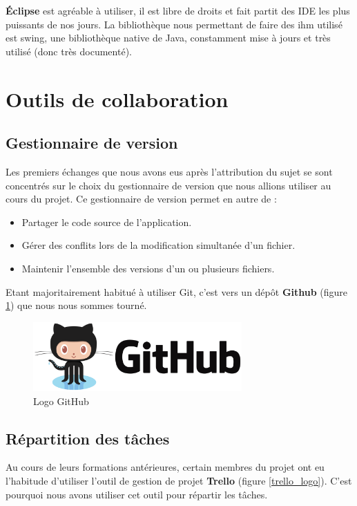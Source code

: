 \textbf{Éclipse} est agréable à utiliser, il est libre de droits et fait partit des IDE les plus puissants de nos jours.
La bibliothèque nous permettant de faire des \gls{ihm} utilisé est swing, une bibliothèque native de Java, constamment mise à jours et très utilisé (donc très documenté).



\section{Outils de collaboration}

\subsection{Gestionnaire de version}
Les premiers échanges que nous avons eus après l'attribution du sujet se sont concentrés sur le choix du gestionnaire de version que nous allions utiliser au cours du projet. Ce gestionnaire de version permet en autre de :
\begin{itemize}
\item Partager le code source de l'application.
\item Gérer des conflits lors de la modification simultanée d'un fichier.
\item Maintenir l'ensemble des versions d'un ou plusieurs fichiers.\\
\end{itemize}

Etant majoritairement habitué à utiliser Git, c'est vers un dép\^ot \textbf{Github} (figure \ref{github_logo}) que nous nous sommes tourné.

\begin{figure}[H]
\centering
\includegraphics[width=8cm]{images/activite/githubLogo.png}
\caption{Logo GitHub}
\label{github_logo}
\end{figure}



\subsection{Répartition des t\^aches}
Au cours de leurs formations antérieures, certain membres du projet ont eu l'habitude d'utiliser l'outil de gestion de projet \textbf{Trello} (figure \ref{trello_logo}). C'est pourquoi nous avons utiliser cet outil pour répartir les t\^aches.\\

